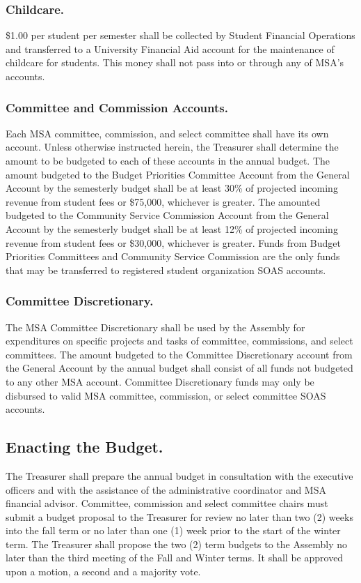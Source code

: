 \subsubsection{Childcare.}
\$1.00 per student per semester shall be collected by Student Financial Operations and transferred to a University Financial Aid account for the maintenance of childcare for students.  This money shall not pass into or through any of MSA's accounts.

\subsubsection{Committee and Commission Accounts.}
Each MSA committee, commission, and select committee shall have its own account.  Unless otherwise instructed herein, the Treasurer shall determine the amount to be budgeted to each of these accounts in the annual budget.
The amount budgeted to the Budget Priorities Committee Account from the General Account by the semesterly budget shall be at least 30\% of projected incoming revenue from student fees or \$75,000, whichever is greater.
The amounted budgeted to the Community Service Commission Account from the General Account by the semesterly budget shall be at least 12\% of projected incoming revenue from student fees or \$30,000, whichever is greater.
\subsubsubsection{}
Funds from Budget Priorities Committees and Community Service Commission are the only funds that may be transferred to registered student organization SOAS accounts.

\subsubsection{Committee Discretionary.}
The MSA Committee Discretionary shall be used by the Assembly for expenditures on specific projects and tasks of committee, commissions, and select committees. The amount budgeted to the Committee Discretionary account from the General Account by the annual budget shall consist of all funds not budgeted to any other MSA account. Committee Discretionary funds may only be disbursed to valid MSA committee, commission, or select committee SOAS accounts.

\subsection{Enacting the Budget.}
The Treasurer shall prepare the annual budget in consultation with the executive officers and with the assistance of the administrative coordinator and MSA financial advisor. Committee, commission and select committee chairs must submit a budget proposal to the Treasurer for review no later than two (2) weeks into the fall term or no later than one (1) week prior to the start of the winter term. The Treasurer shall propose the two (2) term budgets to the Assembly no later than the third meeting of the Fall and Winter terms. It shall be approved upon a motion, a second and a majority vote.

